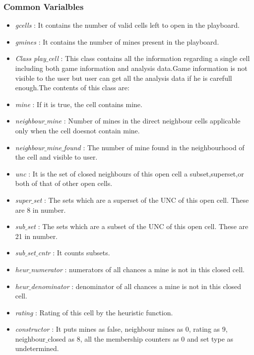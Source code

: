 \documentclass[12pt,a4paper]{report}
\begin{document}
\subsubsection*{Common Varialbles}
\begin{itemize}
\item[]\textit{gcells} : It contains the number of valid cells left to open in the playboard. 
\item[]\textit{gmines} : It contains the number of mines present in the playboard.
\item[]\textit{Class play$\_$cell} : This class contains all the information regarding a single cell including both game information and analysis data.Game information is not visible to the user but user can get all the analysis data if he is carefull enough.The contents of this class are:
\item[]\textit{mine} : If it is true, the cell contains mine.
\item[]\textit{neighbour$\_$mine} : Number of mines in the direct neighbour cells applicable only when the cell doesnot contain mine.
\item[]\textit{neighbour$\_$mine$\_$found} : The number of mine found in the neighbourhood of the cell and visible to user.
\item[]\textit{unc} : It is the set of closed neighbours of this open cell a subset,superset,or both of that of other open cells.
\item[]\textit{super$\_$set} : The sets which are a superset of the UNC of this open cell. These are 8 in number.
\item[]\textit{sub$\_$set} : The sets which are a subset of the UNC of this open cell. These are 21 in number.
\item[]\textit{sub$\_$set$\_$cntr} : It counts subsets.
\item[]\textit{heur$\_$numerator} : numerators of all chances a mine is not in this closed cell. 
\item[]\textit{heur$\_$denominator} : denominator of all chances a mine is not in this closed cell.
\item[]\textit{rating} : Rating of this cell by the heuristic function.
\item[]\textit{constructor} : It puts mines as false, neighbour mines as 0, rating as 9, neighbour$\_$closed as 8, all the membership counters as 0 and set type as undetermined.
 \end{itemize}
\end{document}
